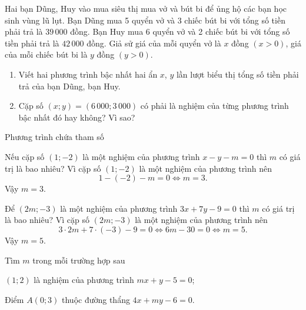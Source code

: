 \begin{vd}
	Hai bạn Dũng, Huy vào mua siêu thị mua vở và bút bi để ủng hộ các bạn học sinh vùng lũ lụt. Bạn Dũng mua 5 quyển vở và 3 chiếc bút bi với tổng số tiền phải trả là $39\, 000$ đồng. Bạn Huy mua 6 quyển vở và 2 chiếc bút bi với tổng số tiền phải trả là $42\, 000$ đồng. Giả sử giá của mỗi quyển vở là $x$ đồng $(x>0)$, giá của mỗi chiếc bút bi là $y$ đồng $(y>0)$.
	\begin{enumerate}
	\item Viết hai phương trình bậc nhất hai ẩn $x$, $y$ lần lượt biểu thị tổng số tiền phải trả của bạn Dũng, bạn Huy.
	\item Cặp số $(x;y)=(6\, 000;3\, 000)$ có phải là nghiệm của từng phương trình bậc nhất đó hay không? Vì sao?
	\end{enumerate}
\end{vd}
\begin{dang}{Phương trình chứa tham số}
\end{dang}
\begin{vd}%
	Nếu cặp số $(1;-2)$ là một nghiệm của phương trình $x - y - m = 0$ thì $m$ có giá trị là bao nhiêu?
	\loigiai
	{
	Vì cặp số $(1;-2)$ là một nghiệm của phương trình nên
	\[1 - ( - 2) - m = 0\Leftrightarrow m = 3.\]
	Vậy $m=3$.
	}
\end{vd}
\begin{vd}%
	Để $(2m;-3)$ là một nghiệm của phương trình $3x +7y - 9 = 0$ thì $m$ có giá trị là bao nhiêu?
	\loigiai
	{
	Vì cặp số $(2m;-3)$ là một nghiệm của phương trình nên
	\[3\cdot2m + 7 \cdot( - 3) - 9 = 0\Leftrightarrow 6m - 30 = 0\Leftrightarrow m = 5.\]
	Vậy $m=5$.
	}
\end{vd}
\begin{vd}
	Tìm $m$ trong mỗi trường hợp sau
	\begin{enumEX}{1}
	\item $(1;2)$ là nghiệm của phương trình $mx+y-5=0$;
	\item Điểm $A(0;3)$ thuộc đường thẩng $4x+my-6=0$. 
	\end{enumEX}
\end{vd}
